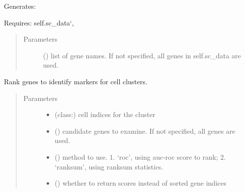 \documentclass[letterpaper,10pt,english]{sphinxmanual}
\begin{document}
\begin{fulllineitems}
\begin{fulllineitems}
Generates: 

Requires: self.sc\_data{}`, 
\begin{quote}\begin{description}
\item[{Parameters}] \leavevmode
{} () \textendash{} list of gene names. If not specified, all genes in self.sc\_data are used.

\end{description}\end{quote}

\end{fulllineitems}


\begin{fulllineitems}
\label{\detokenize{api:spaotsc.SpaOTsc.spatial_sc.rank_marker_genes}}
Rank genes to identify markers for cell clusters.
\begin{quote}\begin{description}
\item[{Parameters}] \leavevmode\begin{itemize}
\item {} 
 (class:) \textendash{} cell indices for the cluster

\item {} 
 () \textendash{} candidate genes to examine. If not specified, all genes are used.

\item {} 
 (\sphinxstyleliteralemphasis{, }) \textendash{} method to use. 1. ‘roc’, using auc-roc score to rank; 2. ‘ranksum’, using ranksum statistics.

\item {} 
 (\sphinxstyleliteralemphasis{, }) \textendash{} whether to return scores instead of sorted gene indices

\end{itemize}


\end{description}
\end{quote}
\end{fulllineitems}
\end{fulllineitems}
\end{document}
